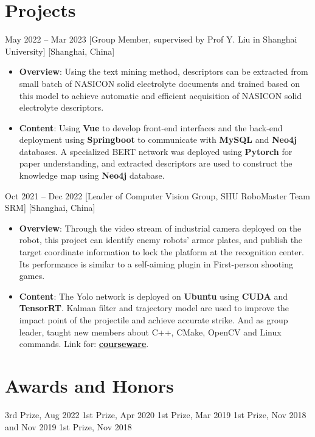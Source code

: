 \documentclass{chicv}
\begin{document}
\section{Projects}

  {May 2022 -- Mar 2023}
  [Group Member, supervised by Prof Y. Liu in Shanghai University]
  [Shanghai, China]
  \begin{itemize}
    \item \textbf{Overview}: Using the text mining method, descriptors can be extracted from small batch of NASICON solid electrolyte documents and trained based on this model to achieve automatic and efficient acquisition of NASICON solid electrolyte descriptors.
    \item \textbf{Content}: Using \textbf{Vue} to develop front-end interfaces and the back-end deployment using \textbf{Springboot} to communicate with \textbf{MySQL} and \textbf{Neo4j} databases. A specialized BERT network was deployed using \textbf{Pytorch} for paper understanding, and extracted descriptors are used to construct the knowledge map using \textbf{Neo4j} database.
  \end{itemize}

  {Oct 2021 -- Dec 2022}
  [Leader of Computer Vision Group, SHU RoboMaster Team SRM]
  [Shanghai, China]
  \begin{itemize}
    \item \textbf{Overview}: Through the video stream of industrial camera deployed on the robot, this project can identify enemy robots' armor plates, and publish the target coordinate information to lock the platform at the recognition center. Its performance is similar to a self-aiming plugin in First-person shooting games.
    \item \textbf{Content}: The Yolo network is deployed on \textbf{Ubuntu} using \textbf{CUDA} and \textbf{TensorRT}. Kalman filter and trajectory model are used to improve the impact point of the projectile and achieve accurate strike. And as group leader, taught new members about C++, CMake, OpenCV and Linux commands. Link for: \href{https://shuzheking.github.io/documents.html}{\textbf{courseware}}.
  \end{itemize}

\section{Awards and Honors}
 {3rd Prize, Aug 2022}
 {1st Prize, Apr 2020}
 {1st Prize, Mar 2019}
 {1st Prize, Nov 2018 and Nov 2019}
 {1st Prize, Nov 2018}
\end{document}
